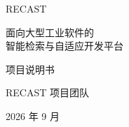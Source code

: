 \documentclass[UTF8,12pt,openany,fontset=fandol]{ctexrep}
\begin{document}
\begin{titlepage}
  \centering
  \vspace*{2.4cm}
  {\heiti RECAST\par}
  \vspace{0.6cm}
  {\heiti 面向大型工业软件的\\[0.35em]
  智能检索与自适应开发平台\par}
  \vspace{1.6cm}
  {\heiti 项目说明书\par}
  \vfill
  {RECAST 项目团队\par}
  \vspace{0.6cm}
  {2026 年 9 月\par}
  \vspace*{1.5cm}
\end{titlepage}

\tableofcontents
\clearpage
{}




\end{document}
